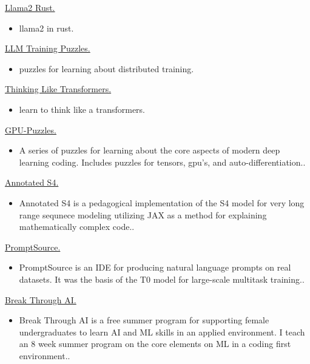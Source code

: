 \documentclass[10pt]{article}
\begin{document}
\bigskip


\bigskip

\ind \href{ paper.link } { Llama2 Rust. }
\begin{itemize}
	\item llama2 in rust.
\end{itemize}
\medskip


\ind \href{ paper.link } { LLM Training Puzzles. }
\begin{itemize}
	\item puzzles for learning about distributed training.
\end{itemize}
\medskip


\ind \href{ paper.link } { Thinking Like Transformers. }
\begin{itemize}
	\item learn to think like a transformers.
\end{itemize}
\medskip


\ind \href{ paper.link } { GPU-Puzzles. }
\begin{itemize}
	\item A series of puzzles for learning about the core aspects of modern deep learning coding. Includes puzzles for tensors, gpu's, and auto-differentiation..
\end{itemize}
\medskip


\ind \href{ paper.link } { Annotated S4. }
\begin{itemize}
	\item Annotated S4 is a pedagogical implementation of the S4 model for very long range sequnece modeling utilizing JAX as a method for explaining mathematically complex code..
\end{itemize}
\medskip


\ind \href{ paper.link } { PromptSource. }
\begin{itemize}
	\item PromptSource is an IDE for producing natural language prompts on real datasets. It was the basis of the T0 model for large-scale multitask training..
\end{itemize}
\medskip


\ind \href{ paper.link } { Break Through AI. }
\begin{itemize}
	\item Break Through AI is a free summer program for supporting female undergraduates to learn AI and ML skills in an applied environment. I teach an 8 week summer program on the core elements on ML in a coding first environment..
\end{itemize}
\medskip
\end{document}
